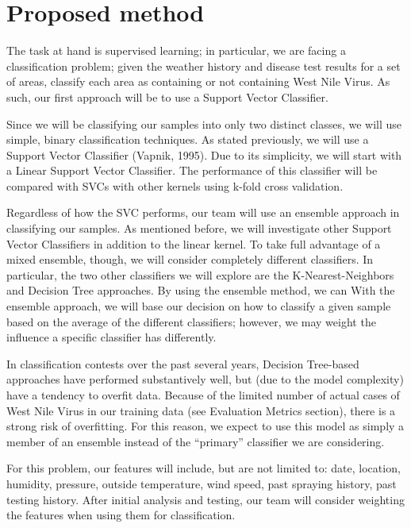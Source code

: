 \documentclass{article} %
\begin{document}
\section{Proposed method}

The task at hand is supervised learning; in particular, we are facing a classification problem; given the weather history and disease test results for a set of areas, classify each area as containing or not containing West Nile Virus.  As such, our first approach will be to use a Support Vector Classifier.   

Since we will be classifying our samples into only two distinct classes, we will use simple, binary classification techniques. As stated previously, we will use a Support Vector Classifier (Vapnik, 1995).  Due to its simplicity, we will start with a Linear Support Vector Classifier.  The performance of this classifier will be compared with SVCs with other kernels using k-fold cross validation.  

Regardless of how the SVC performs, our team will use an ensemble approach in classifying our samples.  As mentioned before, we will investigate other Support Vector Classifiers in addition to the linear kernel.  To take full advantage of a mixed ensemble, though, we will consider completely different classifiers.  In particular, the two other classifiers we will explore are the K-Nearest-Neighbors and Decision Tree approaches.  By using the ensemble method, we can With the ensemble approach, we will base our decision on how to classify a given sample based on the average of the different classifiers; however, we may weight the influence a specific classifier has differently.  

In classification contests over the past several years, Decision Tree-based approaches have performed substantively well, but (due to the model complexity) have a tendency to overfit data.  Because of the limited number of actual cases of West Nile Virus in our training data (see Evaluation Metrics section), there is a strong risk of overfitting.  For this reason, we expect to use this model as simply a member of an ensemble instead of the ``primary'' classifier we are considering.

For this problem, our features will include, but are not limited to: date, location, humidity, pressure, outside temperature, wind speed, past spraying history, past testing history.  After initial analysis and testing, our team will consider weighting the features when using them for classification.
\end{document}
